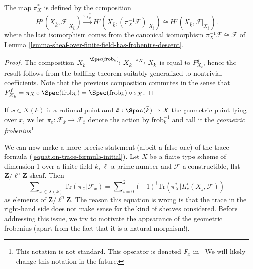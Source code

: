 \noindent
The map $\pi_X^*$ is defined by the composition
$$
H^j(X_{\bar k}, \mathcal{F}|_{X_{\bar k}}) \xrightarrow{{\pi_X}_{\bar k}^*}
H^j(X_{\bar k}, (\pi_X^{-1} \mathcal{F})|_{X_{\bar k}}) \cong
H^j(X_{\bar k}, \mathcal{F}|_{X_{\bar k}}).
$$
where the last isomorphism comes from the canonical isomorphism
$\pi_X^{-1} \mathcal{F} \cong \mathcal{F}$ of
Lemma \ref{lemma-sheaf-over-finite-field-has-frobenius-descent}.

\begin{proof}
The composition $X_{\bar k} \xrightarrow{\Spec(\text{frob}_k)} X_{\bar k}
\xrightarrow{\pi_X} X_{\bar k}$ is equal to $F_{X_{\bar k}}^f$, hence the
result follows from the baffling theorem suitably generalized to nontrivial
coefficients. Note that the previous composition commutes in the sense that
$F_{X_{\bar k}}^f = \pi_X \circ \Spec(\text{frob}_k) =
\Spec(\text{frob}_k) \circ \pi_X$.
\end{proof}

\begin{definition}
\label{definition-geometric-frobenius-on-stalk}
If $x \in X(k)$ is a rational point and $\bar x : \Spec(\bar k) \to X$
the geometric point lying over $x$, we let $\pi_x : \mathcal{F}_{\bar x} \to
\mathcal{F}_{\bar x}$ denote the action by $\text{frob}_k^{-1}$ and call it the
{\it geometric frobenius}\footnote{This notation is not standard.
This operator is denoted $F_x$ in \cite{SGA4.5}. We will likely change
this notation in the future.}
\end{definition}

\noindent
We can now make a more precise statement (albeit a false one) of the trace
formula (\ref{equation-trace-formula-initial}). Let $X$ be a finite
type scheme of dimension 1
over a finite field $k$, $\ell$ a prime number and $\mathcal{F}$ a
constructible, flat $\mathbf{Z}/\ell^n\mathbf{Z}$ sheaf. Then
\begin{equation}
\label{equation-trace-formula-second}
\sum\nolimits_{x \in X(k)}
\text{Tr}(\pi_X | \mathcal{F}_{\bar x})
=
\sum\nolimits_{i=0}^2
(-1)^i \text{Tr}(\pi_X^* | H^i_c(X_{\bar k}, \mathcal{F}))
\end{equation}
as elements of $\mathbf{Z}/\ell^n\mathbf{Z}$. The reason this equation is wrong
is that the trace in the right-hand side does not make sense for the kind of
sheaves considered. Before addressing this issue, we try to motivate the
appearance of the geometric frobenius (apart from the fact that it is a natural
morphism!).

